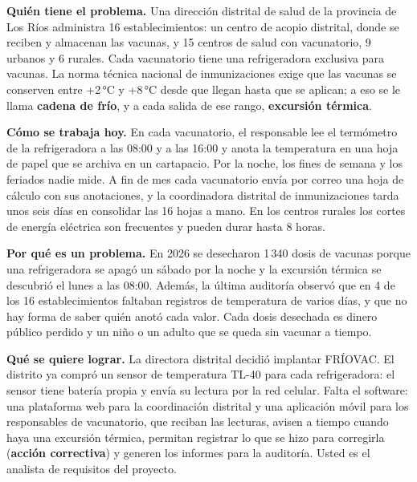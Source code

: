 \documentclass[11pt]{article}
\begin{document}
\begin{cajacaso}[title={El problema que hay que resolver}]
	\textbf{Quién tiene el problema.} Una dirección distrital de salud de la provincia de Los Ríos administra 16 establecimientos: un centro de acopio distrital, donde se reciben y almacenan las vacunas, y 15 centros de salud con vacunatorio, 9 urbanos y 6 rurales. Cada vacunatorio tiene una refrigeradora exclusiva para vacunas. La norma técnica nacional de inmunizaciones exige que las vacunas se conserven entre +2\,°C y +8\,°C desde que llegan hasta que se aplican; a eso se le llama \textbf{cadena de frío}, y a cada salida de ese rango, \textbf{excursión térmica}.\par\smallskip
	\textbf{Cómo se trabaja hoy.} En cada vacunatorio, el responsable lee el termómetro de la refrigeradora a las 08:00 y a las 16:00 y anota la temperatura en una hoja de papel que se archiva en un cartapacio. Por la noche, los fines de semana y los feriados nadie mide. A fin de mes cada vacunatorio envía por correo una hoja de cálculo con sus anotaciones, y la coordinadora distrital de inmunizaciones tarda unos seis días en consolidar las 16 hojas a mano. En los centros rurales los cortes de energía eléctrica son frecuentes y pueden durar hasta 8 horas.\par\smallskip
	\textbf{Por qué es un problema.} En 2026 se desecharon 1\,340 dosis de vacunas porque una refrigeradora se apagó un sábado por la noche y la excursión térmica se descubrió el lunes a las 08:00. Además, la última auditoría observó que en 4 de los 16 establecimientos faltaban registros de temperatura de varios días, y que no hay forma de saber quién anotó cada valor. Cada dosis desechada es dinero público perdido y un niño o un adulto que se queda sin vacunar a tiempo.\par\smallskip
	\textbf{Qué se quiere lograr.} La directora distrital decidió implantar FRÍOVAC. El distrito ya compró un sensor de temperatura TL-40 para cada refrigeradora: el sensor tiene batería propia y envía su lectura por la red celular. Falta el software: una plataforma web para la coordinación distrital y una aplicación móvil para los responsables de vacunatorio, que reciban las lecturas, avisen a tiempo cuando haya una excursión térmica, permitan registrar lo que se hizo para corregirla (\textbf{acción correctiva}) y generen los informes para la auditoría. Usted es el analista de requisitos del proyecto.
\end{cajacaso}
\end{document}
